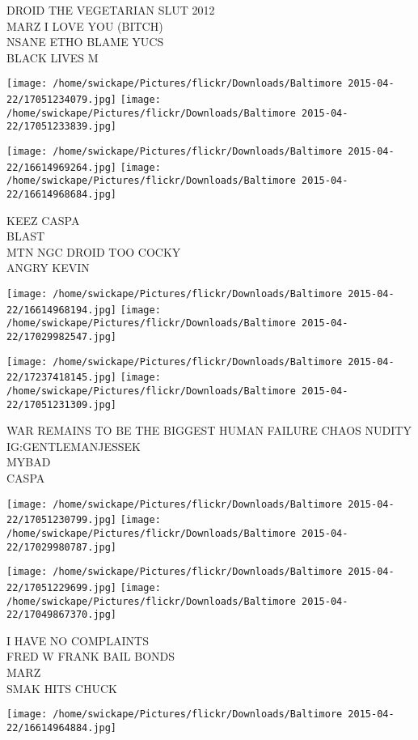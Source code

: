 \documentclass[10pt,letterpaper]{article}
\begin{document}
DROID THE VEGETARIAN SLUT 2012\\
MARZ I LOVE YOU (BITCH)\\
NSANE ETHO BLAME YUCS\\
BLACK LIVES M
\pagebreak

\texttt{[image: /home/swickape/Pictures/flickr/Downloads/Baltimore 2015-04-22/17051234079.jpg]}
\texttt{[image: /home/swickape/Pictures/flickr/Downloads/Baltimore 2015-04-22/17051233839.jpg]}

\texttt{[image: /home/swickape/Pictures/flickr/Downloads/Baltimore 2015-04-22/16614969264.jpg]}
\texttt{[image: /home/swickape/Pictures/flickr/Downloads/Baltimore 2015-04-22/16614968684.jpg]}

KEEZ CASPA\\
BLAST\\
MTN NGC DROID TOO COCKY\\
ANGRY KEVIN
\pagebreak

\texttt{[image: /home/swickape/Pictures/flickr/Downloads/Baltimore 2015-04-22/16614968194.jpg]}
\texttt{[image: /home/swickape/Pictures/flickr/Downloads/Baltimore 2015-04-22/17029982547.jpg]}

\texttt{[image: /home/swickape/Pictures/flickr/Downloads/Baltimore 2015-04-22/17237418145.jpg]}
\texttt{[image: /home/swickape/Pictures/flickr/Downloads/Baltimore 2015-04-22/17051231309.jpg]}

WAR REMAINS TO BE THE BIGGEST HUMAN FAILURE CHAOS NUDITY\\
IG:GENTLEMANJESSEK\\
MYBAD\\
CASPA
\pagebreak

\texttt{[image: /home/swickape/Pictures/flickr/Downloads/Baltimore 2015-04-22/17051230799.jpg]}
\texttt{[image: /home/swickape/Pictures/flickr/Downloads/Baltimore 2015-04-22/17029980787.jpg]}

\texttt{[image: /home/swickape/Pictures/flickr/Downloads/Baltimore 2015-04-22/17051229699.jpg]}
\texttt{[image: /home/swickape/Pictures/flickr/Downloads/Baltimore 2015-04-22/17049867370.jpg]}

I HAVE NO COMPLAINTS\\
FRED W FRANK BAIL BONDS\\
MARZ\\
SMAK HITS CHUCK
\pagebreak

\texttt{[image: /home/swickape/Pictures/flickr/Downloads/Baltimore 2015-04-22/16614964884.jpg]}
\end{document}
